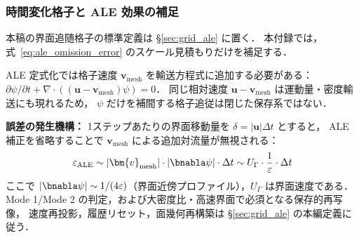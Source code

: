 
\subsubsection{時間変化格子と ALE 効果の補足}
\label{app:grid_ale}

本稿の界面追随格子の標準定義は §\ref{sec:grid_ale} に置く．
本付録では，式~\eqref{eq:ale_omission_error} のスケール見積もりだけを補足する．

ALE 定式化では格子速度 $\bm{v}_\text{mesh}$ を輸送方程式に追加する必要がある：
$\partial\psi/\partial t + \nabla\cdot((\bm{u} - \bm{v}_\text{mesh})\psi) = 0$．
同じ相対速度 $\bm{u}-\bm{v}_\text{mesh}$ は運動量・密度輸送にも現れるため，
$\psi$ だけを補間する格子追従は閉じた保存系ではない．

\textbf{誤差の発生機構：}
1ステップあたりの界面移動量を $\delta = |\bm{u}|\Delta t$ とすると，
ALE 補正を省略することで $\bm{v}_\text{mesh}$ による追加対流量が無視される：
\[
  \varepsilon_{\text{ALE}} \sim |\bm{v}_\text{mesh}| \cdot |\bnabla\psi| \cdot \Delta t \sim U_\Gamma \cdot \frac{1}{\varepsilon} \cdot \Delta t
\]
ここで $|\bnabla\psi| \sim 1/(4\varepsilon)$（界面近傍プロファイル），$U_\Gamma$ は界面速度である．
Mode 1/Mode 2 の判定，および大密度比・高速界面で必須となる保存的再写像，
速度再投影，履歴リセット，面幾何再構築は §\ref{sec:grid_ale} の本編定義に従う．

